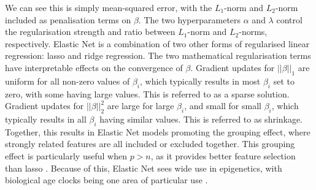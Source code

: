 \documentclass{article} %
\begin{document}
We can see this is simply mean-squared error, with the \(L_1\)-norm and \(L_2\)-norm included as penalisation terms on \(\beta\). The two hyperparameters \(\alpha\) and \(\lambda\) control the regularisation strength and ratio between \(L_1\)-norm and \(L_2\)-norms, respectively. Elastic Net is a combination of two other forms of regularised linear regression: lasso \cite{tibshirani1996regression} and ridge \cite{hoerl1970ridge} regression. The two mathematical regularisation terms have interpretable effects on the convergence of \(\beta\). Gradient updates for \(||\beta||_1\) are uniform for all non-zero values of \(\beta_i\), which typically results in most \(\beta_i\) set to zero, with some having large values. This is referred to as a sparse solution. Gradient updates for \(||\beta||_2^2\) are large for large \(\beta_i\), and small for small \(\beta_i\), which typically results in all \(\beta_i\) having similar values. This is referred to as shrinkage. Together, this results in Elastic Net models promoting the grouping effect, where strongly related features are all included or excluded together. This grouping effect is particularly useful when \(p > n\), as it provides better feature selection than lasso \cite{zou2005regularization}. Because of this, Elastic Net sees wide use in epigenetics, with biological age clocks being one area of particular use \cite{teschendorff2025epigenetic}.
\end{document}
